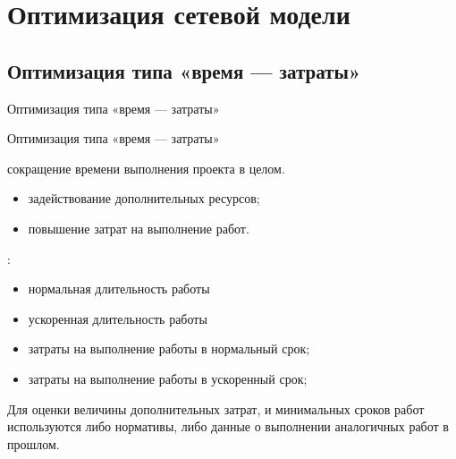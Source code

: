 \documentclass[unicode,11pt,notheorems]{beamer}
\begin{document}
\section{Оптимизация сетевой модели}
\subsection{Оптимизация типа «время --- затраты»}
\begin{frame}{}
\centering \Large
Оптимизация типа «время --- затраты»
\end{frame}
\begin{frame}{Оптимизация типа «время --- затраты»}

	 сокращение времени выполнения проекта в целом. 

	\begin{itemize}
	\item 
		задействование дополнительных ресурсов;
	\item 
		повышение затрат на выполнение работ.
	\end{itemize}

:
\begin{itemize}
\item  
	нормальная длительность работы
\item  
	ускоренная длительность работы
\item  
	затраты на выполнение работы в нормальный срок;
\item  
	затраты на выполнение работы в ускоренный срок;
\end{itemize}

\begin{block}{}
	Для оценки величины дополнительных затрат, и минимальных сроков работ используются либо нормативы, либо данные о выполнении аналогичных работ в прошлом.
\end{block}
\end{frame}
\end{document}
